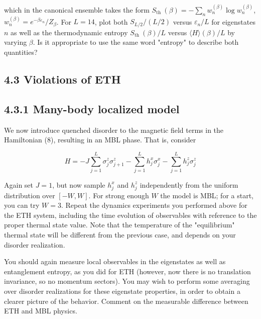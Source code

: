\documentclass[12pt]{article}
\begin{document}
which in the canonical ensemble takes the form $S_{\text {th }}(\beta)=-\sum_{n} w_{n}^{(\beta)} \log w_{n}^{(\beta)}$, $w_{n}^{(\beta)}=e^{-\beta \varepsilon_{n}} / Z_{\beta}$. For $L=14$, plot both $S_{L / 2} /(L / 2)$ versus $\varepsilon_{n} / L$ for eigenstates $n$ as well as the thermodynamic entropy $S_{\text {th }}(\beta) / L$ versus $\langle H\rangle(\beta) / L$ by varying $\beta$. Is it appropriate to use the same word "entropy" to describe both quantities?

\subsection*{4.3 Violations of ETH}
\subsection*{4.3.1 Many-body localized model}
We now introduce quenched disorder to the magnetic field terms in the Hamiltonian (8), resulting in an MBL phase. That is, consider

\begin{equation*}
H=-J \sum_{j=1}^{L} \sigma_{j}^{z} \sigma_{j+1}^{z}-\sum_{j=1}^{L} h_{j}^{x} \sigma_{j}^{x}-\sum_{j=1}^{L} h_{j}^{z} \sigma_{j}^{z} \tag{11}
\end{equation*}

Again set $J=1$, but now sample $h_{j}^{x}$ and $h_{j}^{z}$ independently from the uniform distribution over $[-W, W]$. For strong enough $W$ the model is MBL; for a start, you can try $W=3$. Repeat the dynamics experiments you performed above for the ETH system, including the time evolution of observables with reference to the proper thermal state value. Note that the temperature of the "equilibrium" thermal state will be different from the previous case, and depends on your disorder realization.

You should again measure local observables in the eigenstates as well as entanglement entropy, as you did for ETH (however, now there is no translation invariance, so no momentum sectors). You may wish to perform some averaging over disorder realizations for these eigenstate properties, in order to obtain a clearer picture of the behavior. Comment on the measurable difference between ETH and MBL physics.

\newpage
\end{document}
